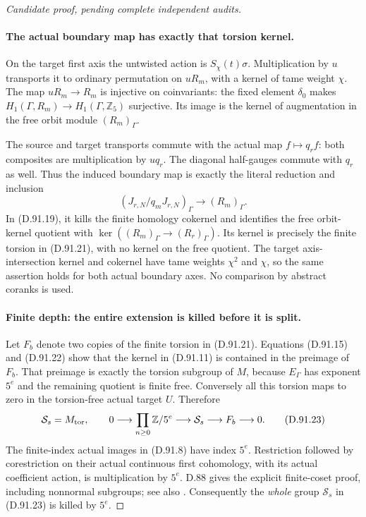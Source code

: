 \begin{proof}[Candidate proof, pending complete independent audits]
\paragraph{The actual boundary map has exactly that torsion kernel.}
On the target first axis the untwisted action is
\(S_\chi(t)\sigma\). Multiplication by \(u\) transports
it to ordinary permutation on \(uR_m\), with a kernel
of tame weight \(\chi\). The map \(uR_m\to R_m\)
is injective on coinvariants: the fixed element \(\delta_0\)
makes \(H_1(\Gamma,R_m)\to H_1(\Gamma,\mathbb Z_5)\)
surjective. Its image is the kernel of augmentation in
the free orbit module \((R_m)_\Gamma\).

The source and target transports commute with the actual
map \(f\mapsto q_rf\): both composites are multiplication
by \(u q_r\). The diagonal half-gauges commute with
\(q_r\) as well. Thus the induced boundary map is
exactly the literal reduction and inclusion
\[
 (J_{r,N}/q_mJ_{r,N})_\Gamma\longrightarrow(R_m)_\Gamma.
                                                               \tag{D.91.22}
\]
In (D.91.19), it kills the finite homology cokernel and
identifies the free orbit-kernel quotient with
\(\ker((R_m)_\Gamma\to(R_r)_\Gamma)\). Its kernel
is precisely the finite torsion in (D.91.21), with no
kernel on the free quotient. The target axis-intersection
kernel and cokernel have tame weights \(\chi^2\) and
\(\chi\), so the same assertion holds for both actual
boundary axes. No comparison by abstract coranks is used.

\paragraph{Finite depth: the entire extension is killed before it is split.}
Let \(F_b\) denote two copies of the finite torsion in
(D.91.21). Equations (D.91.15) and (D.91.22) show that
the kernel in (D.91.11) is contained in the preimage
of \(F_b\). That preimage is exactly the torsion subgroup
of \(M\), because \(E_\Gamma\) has exponent \(5^e\)
and the remaining quotient is finite free. Conversely all
this torsion maps to zero in the torsion-free actual target
\(U\). Therefore
\[
  \mathcal S_s=M_{\rm tor},\qquad
 0\longrightarrow\prod_{n\ge0}\mathbb Z/5^e
   \longrightarrow\mathcal S_s\longrightarrow F_b\longrightarrow0.
                                                               \tag{D.91.23}
\]
The finite-index actual images in (D.91.8) have index
\(5^e\). Restriction followed by corestriction on their
actual continuous first cohomology, with its actual
coefficient action, is multiplication by \(5^e\).
D.88 gives the explicit finite-coset proof, including
nonnormal subgroups; see also \cite[II, Proposition 1.30]{PBC_MilneCFT}.
Consequently the \emph{whole} group \(\mathcal S_s\)
in (D.91.23) is killed by \(5^e\).


\end{proof}
